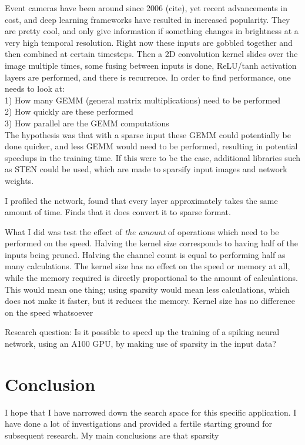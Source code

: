 \noindent Event cameras have been around since 2006 (cite), yet recent advancements in cost, and deep learning frameworks have resulted in increased popularity. They are pretty cool, and only give information if something changes in brightness at a very high temporal resolution. Right now these inputs are gobbled together and then combined at certain timesteps. Then a 2D convolution kernel slides over the image multiple times, some fusing between inputs is done, ReLU/tanh activation layers are performed, and there is recurrence. In order to find performance, one needs to look at: \\ 
1) How many GEMM (general matrix multiplications) need to be performed \\
2) How quickly are these performed \\
3) How parallel are the GEMM computations \\




The hypothesis was that with a sparse input these GEMM could potentially be done quicker, and less GEMM would need to be performed, resulting in potential speedups in the training time. If this were to be the case, additional libraries such as STEN could be used, which are made to sparsify input images and network weights. 

I profiled the network, found that every layer approximately takes the same amount of time. Finds that it does convert it to sparse format. 

What I did was test the effect of \textit{the amount} of operations which need to be performed on the speed. Halving the kernel size corresponds to having half of the inputs being pruned. Halving the channel count is equal to performing half as many calculations. The kernel size has no effect on the speed or memory at all, while the memory required is directly proportional to the amount of calculations. This would mean one thing; using sparsity would mean less calculations, which does not make it faster, but it reduces the memory. 
Kernel size has no difference on the speed whatsoever


Research question: Is it possible to speed up the training of a spiking neural network, using an A100 GPU, by making use of sparsity in the input data?


\section{Conclusion}
I hope that I have narrowed down the search space for this specific application. I have done a lot of investigations and provided a fertile starting ground for subsequent research. My main conclusions are that sparsity

